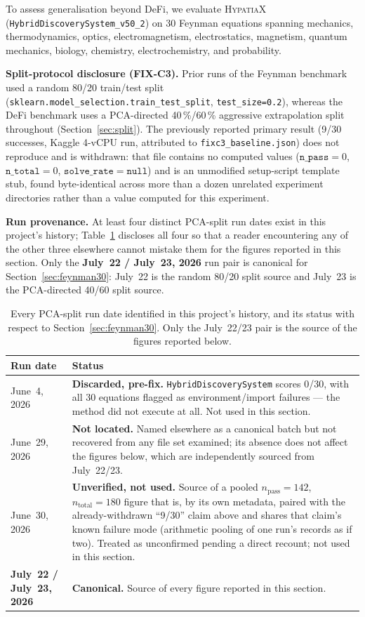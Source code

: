 \documentclass[twoside,11pt]{article}
\begin{document}
To assess generalisation beyond DeFi, we evaluate \textsc{HypatiaX}
(\texttt{HybridDiscoverySystem\_v50\_2}) on 30 Feynman equations spanning
mechanics, thermodynamics, optics, electromagnetism, electrostatics,
magnetism, quantum mechanics, biology, chemistry, electrochemistry, and
probability.

\textbf{Split-protocol disclosure (FIX-C3).}\quad
Prior runs of the Feynman benchmark used a random 80/20 train/test split
(\texttt{sklearn.model\_selection.train\_test\_split}, \texttt{test\_size=0.2}),
whereas the DeFi benchmark uses a PCA-directed 40\,\%/60\,\% aggressive
extrapolation split throughout (Section~\ref{sec:split}).
The previously reported primary result (9/30 successes, Kaggle 4-vCPU run,
attributed to \texttt{fixc3\_baseline.json}) does not reproduce and is
withdrawn: that file contains no computed values
($\mathtt{n\_pass}{=}0$, $\mathtt{n\_total}{=}0$, $\mathtt{solve\_rate}{=}\mathtt{null}$)
and is an unmodified setup-script template stub, found byte-identical across
more than a dozen unrelated experiment directories rather than a value
computed for this experiment.

\textbf{Run provenance.}\quad
At least four distinct PCA-split run dates exist in this project's history;
Table~\ref{tab:provenance} discloses all four so that a reader encountering
any of the other three elsewhere cannot mistake them for the figures reported
in this section. Only the \textbf{July~22 / July~23, 2026} run pair is
canonical for Section~\ref{sec:feynman30}: July~22 is the random 80/20 split
source and July~23 is the PCA-directed 40/60 split source.

\begin{table}[h]
\centering
\caption{Every PCA-split run date identified in this project's history, and
  its status with respect to Section~\ref{sec:feynman30}. Only the
  July~22/23 pair is the source of the figures reported below.}
\label{tab:provenance}
\small
\begin{tabular}{lp{9.3cm}}
\toprule
Run date & Status \\
\midrule
June~4, 2026 & \textbf{Discarded, pre-fix.} \texttt{HybridDiscoverySystem}
scores 0/30, with all 30 equations flagged as environment/import failures
--- the method did not execute at all. Not used in this section. \\
June~29, 2026 & \textbf{Not located.} Named elsewhere as a canonical batch
but not recovered from any file set examined; its absence does not affect
the figures below, which are independently sourced from July~22/23. \\
June~30, 2026 & \textbf{Unverified, not used.} Source of a pooled
$n_{\text{pass}}{=}142$, $n_{\text{total}}{=}180$ figure that is, by its own
metadata, paired with the already-withdrawn ``9/30'' claim above and shares
that claim's known failure mode (arithmetic pooling of one run's records as
if two). Treated as unconfirmed pending a direct recount; not used in this
section. \\
\textbf{July~22 / July~23, 2026} & \textbf{Canonical.} Source of every
figure reported in this section. \\
\bottomrule
\end{tabular}
\end{table}
\end{document}
